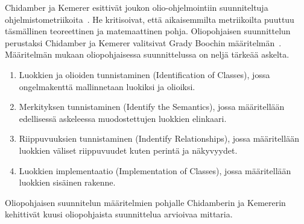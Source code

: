 \documentclass[finnish]{tktltiki2}
\theoremstyle{definition}
\theoremstyle{remark}
\begin{document}
Chidamber ja Kemerer esittivät joukon olio-ohjelmointiin suunniteltuja ohjelmistometriikoita~\cite{CK91, CK94}. He kritisoivat, että aikaisemmilta metriikoilta puuttuu täsmällinen teoreettinen ja matemaattinen pohja. Oliopohjaisen suunnittelun perustaksi Chidamber ja Kemerer valitsivat Grady Boochin määritelmän~\cite{B94}. Määritelmän mukaan oliopohjaisessa suunnittelussa on neljä tärkeää askelta.
\begin{enumerate}
  \item Luokkien ja olioiden tunnistaminen (Identification of Classes), jossa ongelmakenttä mallinnetaan luokiksi ja olioiksi.
  \item Merkityksen tunnistaminen (Identify the Semantics), jossa määritellään edellisessä askeleessa muodostettujen luokkien elinkaari.
  \item Riippuvuuksien tunnistaminen (Indentify Relationships), jossa määritellään luokkien väliset riippuvuudet kuten perintä ja näkyvyydet.
  \item Luokkien implementaatio (Implementation of Classes), jossa määritellään luokkien sisäinen rakenne.
\end{enumerate}

Oliopohjaisen suunnitelun määritelmien pohjalle Chidamberin ja Kemererin kehittivät kuusi oliopohjaista suunnittelua arvioivaa mittaria.
\end{document}
